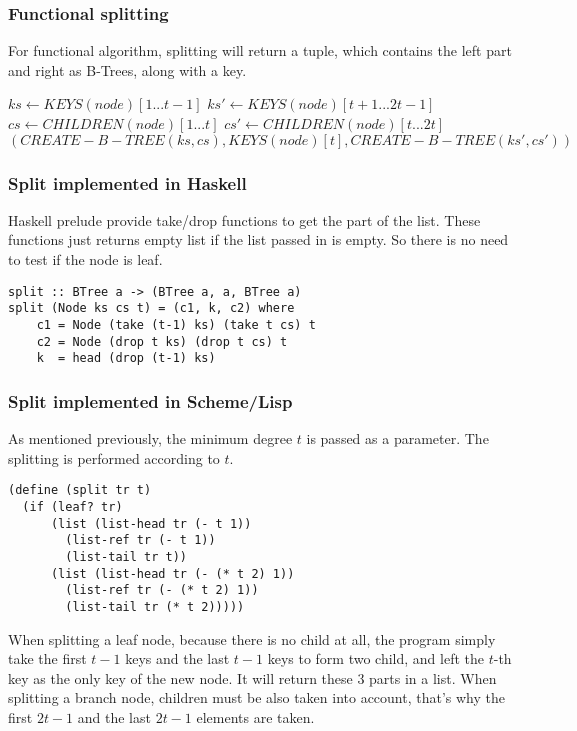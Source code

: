 \documentclass{article}
\begin{document}
\subsubsection{Functional splitting}

For functional algorithm, splitting will return a tuple, which contains the
left part and right as B-Trees, along with a key.

\begin{algorithmic}[1]
  \State $ks \leftarrow KEYS(node)[1 ... t-1]$
  \State $ks' \leftarrow KEYS(node)[t+1 ... 2t-1]$
    \State $cs \leftarrow CHILDREN(node)[1 ... t]$
    \State $cs' \leftarrow CHILDREN(node)[t ... 2t]$
  \EndIf
  \State \Return $(CREATE-B-TREE(ks, cs), KEYS(node)[t], CREATE-B-TREE(ks', cs'))$
\EndFunction
\end{algorithmic}

\subsubsection*{Split implemented in Haskell}
Haskell prelude provide take/drop functions to get the part
of the list. These functions just returns empty list if the 
list passed in is empty. So there is no need to test if
the node is leaf.

\lstset{language=Haskell}
\begin{lstlisting}
split :: BTree a -> (BTree a, a, BTree a)
split (Node ks cs t) = (c1, k, c2) where
    c1 = Node (take (t-1) ks) (take t cs) t
    c2 = Node (drop t ks) (drop t cs) t
    k  = head (drop (t-1) ks)
\end{lstlisting}

\subsubsection*{Split implemented in Scheme/Lisp}
As mentioned previously, the minimum degree $t$ is passed as a parameter.
The splitting is performed according to $t$.

\lstset{language=lisp}
\begin{lstlisting}
(define (split tr t)
  (if (leaf? tr)
      (list (list-head tr (- t 1))
	    (list-ref tr (- t 1))
	    (list-tail tr t))
      (list (list-head tr (- (* t 2) 1)) 
	    (list-ref tr (- (* t 2) 1))
	    (list-tail tr (* t 2)))))
\end{lstlisting}

When splitting a leaf node, because there is no child at all, the
program simply take the first $t-1$ keys and the last $t-1$ keys
to form two child, and left the $t$-th key as the only key of the
new node. It will return these 3 parts in a list. When splitting
a branch node, children must be also taken into account, that's
why the first $2t-1$ and the last $2t-1$ elements are taken.
\end{document}
